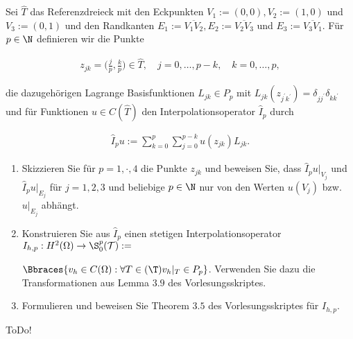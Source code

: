 
\begin{exercise}

Sei $\hat{T}$ das Referenzdreieck mit den Eckpunkten $V_1 := (0,0), V_2 := (1,0)$ und $V_3 := (0,1)$ und den Randkanten $E_1 :=\overline{V_1V_2}, E_2 :=\overline{V_2V_3}$ und
$E_3 :=\overline{V_3V_1}$. Für $p \in \N$ definieren wir die Punkte

\begin{align}
  z_{jk}
  =
  \Big(\frac{j}{p}, \frac{k}{p} \Big) \in \hat{T},
  \quad
  j = 0, \dots, p-k,
  \quad
  k = 0, \dots, p,
\end{align}

die dazugehörigen Lagrange Basisfunktionen $L_{jk} \in P_p$ mit $L_{jk}(z_{j^\prime k^\prime}) = \delta_{jj^\prime}\delta_{kk^\prime}$ und für Funktionen $u \in C(\hat{T})$ den Interpolationsoperator $\hat{I}_p$ durch

\begin{align}
  \hat{I}_pu
  :=
  \sum_{k=0}^p
    \sum_{j=0}^{p-k} u(z_{jk})L_{jk}.
\end{align}

\begin{enumerate}[label = \textbf{\alph*)}]
  \item Skizzieren Sie für $p = 1, \cdot, 4$ die Punkte $z_{jk}$ und beweisen Sie, dass $\hat{I}_p u|_{V_j}$ und $\hat{I}_p u|_{E_j}$ für $j = 1,2,3$ und beliebige $p \in \N$ nur von den Werten $u(V_j)$ bzw. $u|_{E_j}$ abhängt.

  \item Konstruieren Sie aus $\hat{I}_p$ einen stetigen Interpolationsoperator $I_{h,p}: H^2(\Omega) \rightarrow \S_0^p(\mathcal{T}) :=$

  $\Bbraces{v_h \in C(\Omega): \forall T \in \mathcal(\T) v_h|_T \in P_p}$.
  Verwenden Sie dazu die Transformationen aus Lemma $3.9$ des Vorlesungsskriptes.

  \item Formulieren und beweisen Sie Theorem $3.5$ des Vorlesungsskriptes für $I_{h,p}$.
\end{enumerate}
\end{exercise}


\begin{solution}

ToDo!

\end{solution}

